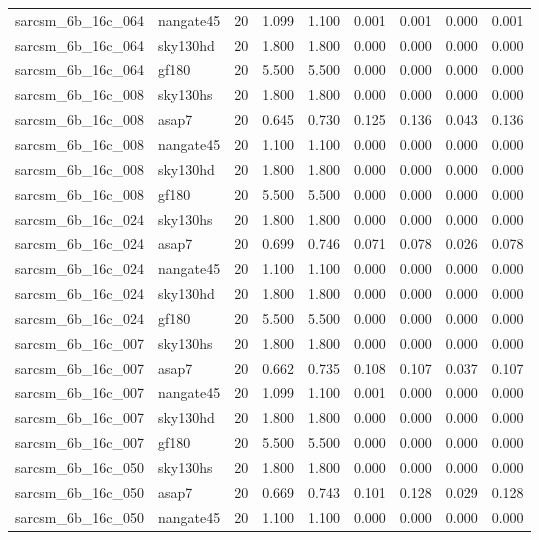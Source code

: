 \begin{tabular}{llrrrrrrr}
sarcsm\_6b\_16c\_064 & nangate45 & 20 & 1.099 & 1.100 & 0.001 & 0.001 & 0.000 & 0.001 \\
sarcsm\_6b\_16c\_064 & sky130hd & 20 & 1.800 & 1.800 & 0.000 & 0.000 & 0.000 & 0.000 \\
sarcsm\_6b\_16c\_064 & gf180 & 20 & 5.500 & 5.500 & 0.000 & 0.000 & 0.000 & 0.000 \\
sarcsm\_6b\_16c\_008 & sky130hs & 20 & 1.800 & 1.800 & 0.000 & 0.000 & 0.000 & 0.000 \\
sarcsm\_6b\_16c\_008 & asap7 & 20 & 0.645 & 0.730 & 0.125 & 0.136 & 0.043 & 0.136 \\
sarcsm\_6b\_16c\_008 & nangate45 & 20 & 1.100 & 1.100 & 0.000 & 0.000 & 0.000 & 0.000 \\
sarcsm\_6b\_16c\_008 & sky130hd & 20 & 1.800 & 1.800 & 0.000 & 0.000 & 0.000 & 0.000 \\
sarcsm\_6b\_16c\_008 & gf180 & 20 & 5.500 & 5.500 & 0.000 & 0.000 & 0.000 & 0.000 \\
sarcsm\_6b\_16c\_024 & sky130hs & 20 & 1.800 & 1.800 & 0.000 & 0.000 & 0.000 & 0.000 \\
sarcsm\_6b\_16c\_024 & asap7 & 20 & 0.699 & 0.746 & 0.071 & 0.078 & 0.026 & 0.078 \\
sarcsm\_6b\_16c\_024 & nangate45 & 20 & 1.100 & 1.100 & 0.000 & 0.000 & 0.000 & 0.000 \\
sarcsm\_6b\_16c\_024 & sky130hd & 20 & 1.800 & 1.800 & 0.000 & 0.000 & 0.000 & 0.000 \\
sarcsm\_6b\_16c\_024 & gf180 & 20 & 5.500 & 5.500 & 0.000 & 0.000 & 0.000 & 0.000 \\
sarcsm\_6b\_16c\_007 & sky130hs & 20 & 1.800 & 1.800 & 0.000 & 0.000 & 0.000 & 0.000 \\
sarcsm\_6b\_16c\_007 & asap7 & 20 & 0.662 & 0.735 & 0.108 & 0.107 & 0.037 & 0.107 \\
sarcsm\_6b\_16c\_007 & nangate45 & 20 & 1.099 & 1.100 & 0.001 & 0.000 & 0.000 & 0.000 \\
sarcsm\_6b\_16c\_007 & sky130hd & 20 & 1.800 & 1.800 & 0.000 & 0.000 & 0.000 & 0.000 \\
sarcsm\_6b\_16c\_007 & gf180 & 20 & 5.500 & 5.500 & 0.000 & 0.000 & 0.000 & 0.000 \\
sarcsm\_6b\_16c\_050 & sky130hs & 20 & 1.800 & 1.800 & 0.000 & 0.000 & 0.000 & 0.000 \\
sarcsm\_6b\_16c\_050 & asap7 & 20 & 0.669 & 0.743 & 0.101 & 0.128 & 0.029 & 0.128 \\
sarcsm\_6b\_16c\_050 & nangate45 & 20 & 1.100 & 1.100 & 0.000 & 0.000 & 0.000 & 0.000 \\

\end{tabular}
